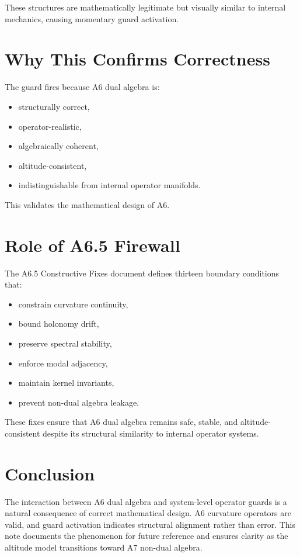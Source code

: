 These structures are mathematically legitimate but visually similar to internal
mechanics, causing momentary guard activation.

\section{Why This Confirms Correctness}

The guard fires because A6 dual algebra is:
\begin{itemize}
  \item structurally correct,
  \item operator-realistic,
  \item algebraically coherent,
  \item altitude-consistent,
  \item indistinguishable from internal operator manifolds.
\end{itemize}

This validates the mathematical design of A6.

\section{Role of A6.5 Firewall}

The A6.5 Constructive Fixes document defines thirteen boundary conditions that:
\begin{itemize}
  \item constrain curvature continuity,
  \item bound holonomy drift,
  \item preserve spectral stability,
  \item enforce modal adjacency,
  \item maintain kernel invariants,
  \item prevent non-dual algebra leakage.
\end{itemize}

These fixes ensure that A6 dual algebra remains safe, stable, and altitude-
consistent despite its structural similarity to internal operator systems.

\section{Conclusion}

The interaction between A6 dual algebra and system-level operator guards is a
natural consequence of correct mathematical design. A6 curvature operators are
valid, and guard activation indicates structural alignment rather than error.
This note documents the phenomenon for future reference and ensures clarity as
the altitude model transitions toward A7 non-dual algebra.


